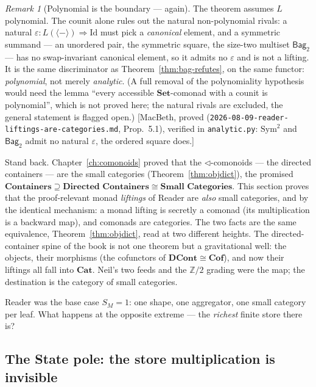 \documentclass[11pt,a4paper]{book}
\newcommand{\Set}{\mathbf{Set}}
\newcommand{\Cat}{\mathbf{Cat}}
\newcommand{\Cof}{\mathbf{Cof}}
\newcommand{\DCont}{\mathbf{DCont}}
\theoremstyle{plain}
\theoremstyle{definition}
\theoremstyle{remark}
\newtheorem{Remark}[Theorem]{Remark}
\newcommand{\prov}[1]{\hfill\textsf{\footnotesize[#1]}}
\begin{document}
\begin{Remark}[Polynomial is the boundary --- again]\label{rem:analytic-excluded}
The theorem assumes $L$ polynomial. The counit alone rules out the natural non-polynomial rivals: a
natural $\varepsilon\colon L(\langle-\rangle)\Rightarrow\mathrm{Id}$ must pick a \emph{canonical}
element, and a symmetric summand --- an unordered pair, the symmetric square, the size-two multiset
$\mathsf{Bag}_{2}$ --- has no swap-invariant canonical element, so it admits no $\varepsilon$ and is
not a lifting. It is the same discriminator as Theorem~\ref{thm:bag-refutes}, on the same functor:
\emph{polynomial}, not merely \emph{analytic}. (A full removal of the polynomiality hypothesis would
need the lemma ``every accessible $\Set$-comonad with a counit is polynomial'', which is not proved
here; the natural rivals are excluded, the general statement is flagged open.)
\prov{MacBeth, proved (\texttt{2026-08-09-reader-liftings-are-categories.md}, Prop.~5.1), verified in
\texttt{analytic.py}: $\mathrm{Sym}^{2}$ and $\mathsf{Bag}_{2}$ admit no natural $\varepsilon$, the
ordered square does.}
\end{Remark}

\begin{teachbox}[The whole boundary lands on $\Cat$]
Stand back. Chapter~\ref{ch:comonoids} proved that the $\triangleleft$-comonoids --- the directed
containers --- are the small categories (Theorem~\ref{thm:objdict}), the promised
$\textbf{Containers}\supseteq\textbf{Directed Containers}\cong\textbf{Small Categories}$. This section
proves that the proof-relevant monad \emph{liftings} of Reader are \emph{also} small categories, and
by the identical mechanism: a monad lifting is secretly a comonad (its multiplication is a backward
map), and comonads are categories. The two facts are the same equivalence, Theorem~\ref{thm:objdict},
read at two different heights. The directed-container spine of the book is not one theorem but a gravitational
well: the objects, their morphisms (the cofunctors of $\DCont\cong\Cof$), and now their liftings all
fall into $\Cat$. Neil's two feeds and the $\mathbb Z/2$ grading were the map; the destination is the category
of small categories.
\end{teachbox}

Reader was the base case $S_{M}=1$: one shape, one aggregator, one small category per leaf. What
happens at the opposite extreme --- the \emph{richest} finite store there is?

\subsection{The State pole: the store multiplication is invisible}
\label{sec:state-liftings}
\end{document}
